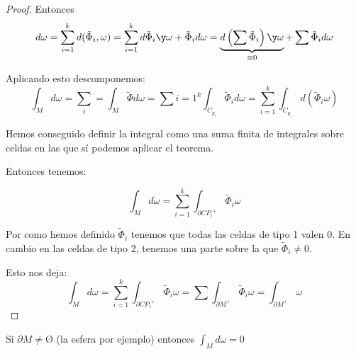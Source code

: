 \begin{proof}
Entonces \[d\omega = \sum_{i=1}^k d(\tilde{\Phi}_i,\omega) = \sum_{i=1}^k d\tilde{\Phi}_i\y \omega + \tilde{\Phi}_i d\omega = \underbrace{d\left(\sum \tilde{\Phi}_i\right) \y \omega}_{\equiv 0} + \sum \tilde{\Phi}_id\omega\]

Aplicando esto descomponemos:
\[\int_M d\omega = \sum_i = \int_M \tilde{\Phi}d\omega = \sum{i=1}^k \int_{C_{p_i}} \tilde{\Phi}_id\omega=\sum_{i=1}^k \int_{C_{p_i}} d(\tilde{\Phi}_i\omega)
\]

Hemos conseguido definir la integral como una suma finita de integrales sobre celdas en las que sí podemos aplicar el teorema.

Entonces tenemos:

\[\int_M d\omega = \sum_{i=1}^k \int_{\partial  C{P_i}^{+}} \tilde{\Phi}_i\omega\]


Por como hemos definido $\tilde{\Phi}_i$ tenemos que todas las celdas de tipo 1 valen 0. En cambio en las celdas de tipo 2, tenemos una parte sobre la que $\tilde{\Phi}_i \neq 0$.

Esto nos deja: \[\int_M d\omega = \sum_{i=1}^k \int_{\partial  C{P_i}^{+}} \tilde{\Phi}_i\omega = \sum \int_{\partial M^+} \tilde{\Phi}_i \omega = \int_{\partial M^+} \omega\]

\end{proof}

\obs Si $\partial M \neq Ø$ (la esfera por ejemplo) entonces $\int_{M} d\omega =0$



